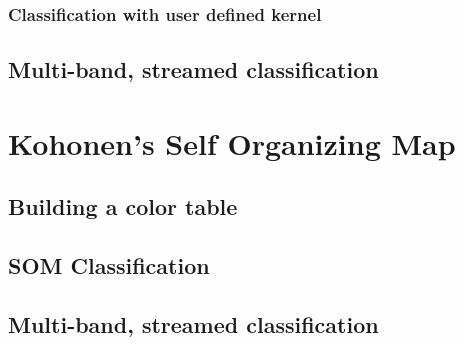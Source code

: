 \subsubsection{Classification with user defined kernel}

\ifitkFullVersion

\fi

\subsection{Multi-band, streamed classification}

\ifitkFullVersion

\fi


\section{Kohonen's Self Organizing Map}
\label{sec:SOM}

\subsection{Building a color table}
\label{sec:SOMColorTable}

\subsection{SOM Classification}
\label{sec:SOMClassification}


\subsection{Multi-band, streamed classification}

\ifitkFullVersion

\fi

